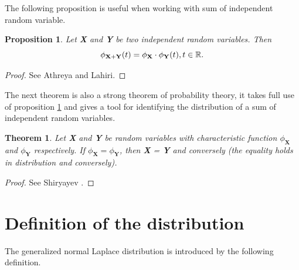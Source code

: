 \documentclass[12pt,travaildirige,nobabel, twoside]{dms}
\numberwithin{equation}{section}
\numberwithin{table}{chapter}
\numberwithin{figure}{chapter}
\newtheorem{proposition}{Proposition}[section]
\newtheorem{theorem}{Theorem}[section]
\begin{document}
The following proposition is useful when working with sum of independent random variable.\\

\begin{proposition} \label{prop:convo ind}
Let \textbf{X} and \textbf{Y} be two independent random variables.
Then 
\begin{equation}
\phi_{\textbf{X}+\textbf{Y}}(t)=\phi_\textbf{X}\cdot\phi_\textbf{Y}(t), t\in\mathbb{R}\text{\nocite{proba}.}
\end{equation}
\end{proposition}

\begin{proof}
See Athreya and Lahiri\citep{proba}.
\end{proof}

The next theorem is also a strong theorem of probability theory, it takes full use of  proposition \ref{prop:convo ind} and gives a tool for identifying the distribution of a sum of independent random variables.\\

\begin{theorem} \label{thm:charactheristic function}
Let \textbf{X} and \textbf{Y} be random variables with characteristic function $\phi_\textbf{X}$ and $\phi_\textbf{Y}$ respectively.
If $\phi_\textbf{X} =\phi_\textbf{Y}$, then \textbf{X} = \textbf{Y} and conversely (the equality holds in distribution and conversely)\nocite{distquadGNL}.
\end{theorem}

\begin{proof}
See Shiryayev \citep{shiryayev}.
\end{proof}
\section{Definition of the distribution}

The generalized normal Laplace distribution is introduced by the following definition. \\
\end{document}
